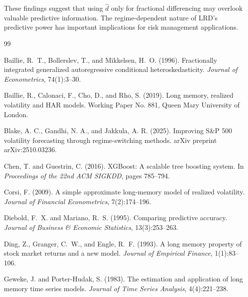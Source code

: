 \documentclass[12pt,a4paper]{article}
\begin{document}
These findings suggest that using $\hat{d}$ only for fractional differencing may overlook valuable predictive information. The regime-dependent nature of LRD's predictive power has important implications for risk management applications.

\newpage


\begin{thebibliography}{99}

Baillie, R.~T., Bollerslev, T., and Mikkelsen, H.~O. (1996).
\newblock Fractionally integrated generalized autoregressive conditional heteroskedasticity.
\newblock \textit{Journal of Econometrics}, 74(1):3--30.

Baillie, R., Calonaci, F., Cho, D., and Rho, S. (2019).
\newblock Long memory, realized volatility and HAR models.
\newblock Working Paper No. 881, Queen Mary University of London.

Blake, A. C., Gandhi, N. A., and Jakkula, A. R. (2025).
\newblock Improving S\&P 500 volatility forecasting through regime-switching methods.
\newblock arXiv preprint arXiv:2510.03236.

Chen, T. and Guestrin, C. (2016).
\newblock XGBoost: A scalable tree boosting system.
\newblock In \textit{Proceedings of the 22nd ACM SIGKDD}, pages 785--794.

Corsi, F. (2009).
\newblock A simple approximate long-memory model of realized volatility.
\newblock \textit{Journal of Financial Econometrics}, 7(2):174--196.

Diebold, F.~X. and Mariano, R.~S. (1995).
\newblock Comparing predictive accuracy.
\newblock \textit{Journal of Business \& Economic Statistics}, 13(3):253--263.

Ding, Z., Granger, C.~W., and Engle, R.~F. (1993).
\newblock A long memory property of stock market returns and a new model.
\newblock \textit{Journal of Empirical Finance}, 1(1):83--106.

Geweke, J. and Porter-Hudak, S. (1983).
\newblock The estimation and application of long memory time series models.
\newblock \textit{Journal of Time Series Analysis}, 4(4):221--238.


\end{thebibliography}
\end{document}
